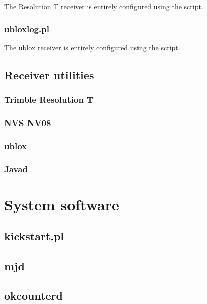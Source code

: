 \documentclass[11pt,a4paper,openany,oneside]{book}
\begin{document}
The Resolution T receiver is entirely configured using the script.

\subsection{ubloxlog.pl}

The ublox receiver is entirely configured using the script.

\section{Receiver utilities}

\subsection{Trimble Resolution T}

\subsection{NVS NV08}

\subsection{ublox}

\subsection{Javad}


\chapter{System software}

\section{kickstart.pl}

\section{mjd}

\section{okcounterd}

\end{document}
